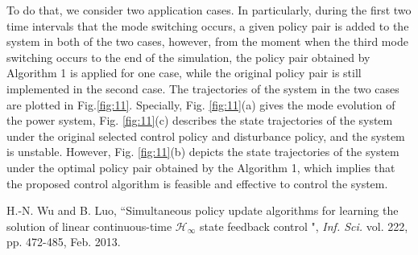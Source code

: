 \documentclass[journal]{IEEEtran}
\begin{document}
To do that, we consider two application cases. In particularly, during the first two time intervals that the mode switching occurs, a given policy pair is added to the system in both of the two cases,  however, from the moment when the third mode switching occurs to the end of the simulation, the  policy pair obtained by Algorithm 1 is applied  for one case, while  the original policy pair is still implemented in the second case.
The trajectories of the system in the two cases are plotted in Fig.\ref{fig:11}. Specially,   Fig. \ref{fig:11}(a) gives the mode evolution of the power system, Fig. \ref{fig:11}(c) describes the state trajectories of the system under the original selected control policy and disturbance policy, and the system is unstable. However, Fig. \ref{fig:11}(b) depicts the state trajectories of the system under the optimal policy pair obtained by the Algorithm 1, which implies that the proposed control algorithm is feasible and effective to control the system.




\vskip 0.5cm

\bigskip
\def\toto#1#2{\centerline{\hbox to 0.7cm{#1\hss}
\parbox[t]{15cm}{#2}}\vspace{0.2cm}}

\begin{thebibliography}{alpha}	
 H.-N. Wu and B. Luo, ``Simultaneous policy update algorithms for learning the solution of linear continuous-time $\mathcal H_ {\infty}$ state feedback control ", \emph{Inf. Sci.} vol. 222, pp. 472-485, Feb. 2013.

\end{thebibliography}
			
\end{document}
